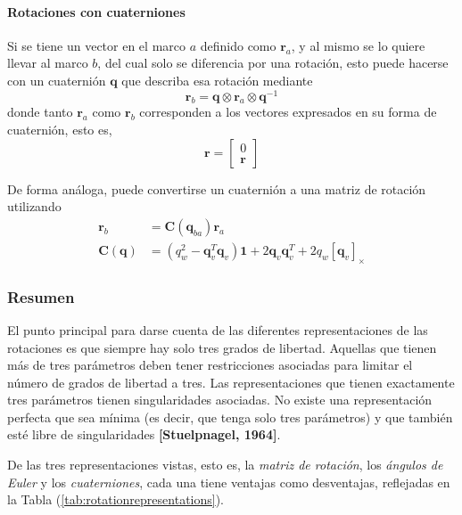\paragraph{Rotaciones con cuaterniones}
Si se tiene un vector en el marco $a$ definido como $\bm{r}_a$, y al mismo se lo quiere llevar al marco $b$, del cual solo se diferencia por una rotación, esto puede hacerse con un cuaternión $\bm{q}$ que describa esa rotación mediante
\begin{equation}
    \bm{r}_b = \bm{q}\otimes\bm{r}_a\otimes\bm{q}^{-1}
    \label{eq:quaternionvectorrotation}
\end{equation}
donde tanto $\bm{r}_a$ como $\bm{r}_b$ corresponden a los vectores expresados en su forma de cuaternión, esto es,
\begin{equation}
    \bm{r} = 
    \begin{bmatrix}
    0 \\
    \bm{r}
    \end{bmatrix}
    \label{eq:vectorquaternionform}
\end{equation}

De forma análoga, puede convertirse un cuaternión a una matriz de rotación utilizando
\begin{align}
    \bm{r}_b &= \bm{C}(\bm{q}_{ba})\bm{r}_a \\
    \bm{C}(\bm{q}) &= (q_w^2 - \bm{q}_v^T\bm{q}_v)\bm{1} + 2\bm{q}_v\bm{q}_v^T + 2q_w\left[\bm{q}_v\right]_\times
\end{align}

\subsubsection{Resumen}
El punto principal para darse cuenta de las diferentes representaciones de las rotaciones es que siempre hay solo tres grados de libertad. Aquellas que tienen más de tres parámetros deben tener restricciones asociadas para limitar el número de grados de libertad a tres. Las representaciones que tienen exactamente tres parámetros tienen singularidades asociadas. No existe una representación perfecta que sea mínima (es decir, que tenga solo tres parámetros) y que también esté libre de singularidades \textbf{[Stuelpnagel, 1964]}.

De las tres representaciones vistas, esto es, la \textit{matriz de rotación}, los \textit{ángulos de Euler} y los \textit{cuaterniones}, cada una tiene ventajas como desventajas, reflejadas en la Tabla (\ref{tab:rotationrepresentations}).

